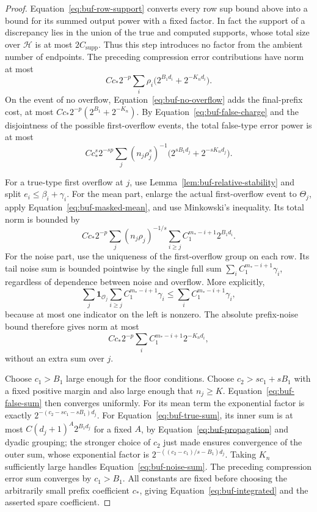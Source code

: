 \begin{proof}
Equation~\eqref{eq:buf-row-support} converts every row sup bound above
into a bound for its summed output power with a fixed factor.
In fact the support of a discrepancy lies in the union of the true and
computed supports, whose total size over $\mathcal H$ is at most
$2C_{\mathrm{supp}}$.  Thus this step introduces no factor from the
ambient number of endpoints.
The preceding compression error contributions have norm at most
\[
 Cc_*2^{-p}\sum_i\rho_i
             \bigl(2^{B_1d_i}+2^{-K_nd_i}\bigr).
\]
On the event of no overflow, Equation~\eqref{eq:buf-no-overflow} adds the
final-prefix cost, at most $Cc_*2^{-p}(2^{B_1}+2^{-K_n})$.
By Equation~\eqref{eq:buf-false-charge} and the disjointness of the
possible first-overflow events, the total false-type error power is at
most
\begin{equation}
 Cc_*^s2^{-sp}\sum_j
       (n_j\rho_j^s)^{-1}
       \bigl(2^{sB_1d_j}+2^{-sK_nd_j}\bigr).
 \label{eq:buf-false-sum}
\end{equation}

For a true-type first overflow at $j$, use
Lemma~\ref{lem:buf-relative-stability} and split $e_i\leq\beta_i+\gamma_i$.
For the mean part, enlarge the actual first-overflow event to $\Theta_j$,
apply Equation~\eqref{eq:buf-masked-mean}, and use Minkowski's inequality.
Its total norm is bounded by
\begin{equation}
 Cc_*2^{-p}\sum_j(n_j\rho_j)^{-1/s}
       \sum_{i\geq j}C_1^{m_*-i+1}2^{B_1d_i}.
 \label{eq:buf-true-sum}
\end{equation}
For the noise part, use the uniqueness of the first-overflow group on
each row.  Its tail noise sum is bounded pointwise by the single full
sum $\sum_iC_1^{m_*-i+1}\gamma_i$, regardless of dependence between
noise and overflow.  More explicitly,
\[
 \sum_j\mathbf1_{\mathcal O_j}
       \sum_{i\geq j}C_1^{m_*-i+1}\gamma_i
 \leq\sum_i C_1^{m_*-i+1}\gamma_i,
\]
because at most one indicator on the left is nonzero.  The absolute
prefix-noise bound therefore gives
norm at most
\begin{equation}
 Cc_*2^{-p}\sum_iC_1^{m_*-i+1}2^{-K_nd_i},
 \label{eq:buf-noise-sum}
\end{equation}
without an extra sum over $j$.

Choose $c_1>B_1$ large enough for the floor conditions.  Choose
$c_2>sc_1+sB_1$ with a fixed positive margin and also large enough that
$n_j\geq K$.  Equation~\eqref{eq:buf-false-sum} then converges uniformly.
For its mean term the exponential factor is exactly
$2^{-(c_2-sc_1-sB_1)d_j}$.
For Equation~\eqref{eq:buf-true-sum}, its inner sum is at most
$C(d_j+1)^A2^{B_1d_j}$ for a fixed $A$, by
Equation~\eqref{eq:buf-propagation} and dyadic grouping; the stronger
choice of $c_2$ just made ensures convergence of the outer sum, whose
exponential factor is
$2^{-((c_2-c_1)/s-B_1)d_j}$.
Taking $K_n$ sufficiently large handles Equation~\eqref{eq:buf-noise-sum}.
The preceding compression error sum converges by $c_1>B_1$.  All constants are fixed before
choosing the arbitrarily small prefix coefficient $c_*$, giving
Equation~\eqref{eq:buf-integrated} and the asserted spare coefficient.
\end{proof}

